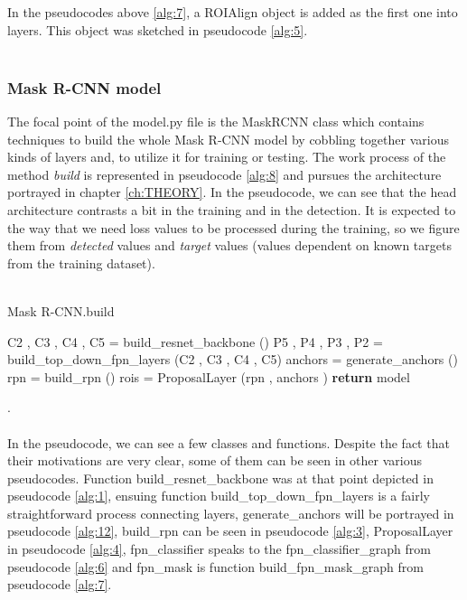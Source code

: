 In the pseudocodes above \ref{alg:7}, a ROIAlign object is added as the first one into layers. This object was sketched in pseudocode \ref{alg:5}.
\\
\\
\subsubsection{Mask R-CNN model} \label{sec:maskmodel}

The focal point of the model.py file is the MaskRCNN class which contains techniques to build the whole Mask R-CNN model by cobbling together various kinds of layers  and, to utilize it for training or testing. The work process of the method \textit{build} is represented in pseudocode \ref{alg:8} and pursues the architecture portrayed in chapter \ref{ch:THEORY}. In the pseudocode, we can see that the head architecture contrasts a bit in the training and in the detection. It is expected to 
the way that we need loss values to be processed during the training, so we figure them from \textit{detected} values and \textit{target} values (values dependent on known targets from the training dataset).
\\
\\
\begin{algorithm}[H] \label{alg:8}
  \caption{Mask R-CNN.build}
  \SetAlgoLined
  \DontPrintSemicolon
 C2 , C3 , C4 , C5 = build\_resnet\_backbone ()\;
 P5 , P4 , P3 , P2 = build\_top\_down\_fpn\_layers (C2 , C3 , C4 , C5)\;
 anchors = generate\_anchors ()\;
 rpn = build\_rpn ()\;
 rois = ProposalLayer (rpn , anchors )\;
 \textbf{return} model\;
\end{algorithm}
.\\
\\ 
In the pseudocode, we can see a few classes and functions. Despite the fact that their motivations are very clear, some of them can be seen in other various pseudocodes. Function
build\_resnet\_backbone was at that point depicted in pseudocode \ref{alg:1}, ensuing function build\_top\_down\_fpn\_layers is a fairly straightforward process connecting layers, generate\_anchors will be portrayed in pseudocode  \ref{alg:12}, build\_rpn can be seen in pseudocode \ref{alg:3}, ProposalLayer in pseudocode \ref{alg:4}, fpn\_classifier speaks to the fpn\_classifier\_graph from pseudocode  \ref{alg:6} and fpn\_mask is function build\_fpn\_mask\_graph from pseudocode  \ref{alg:7}.

